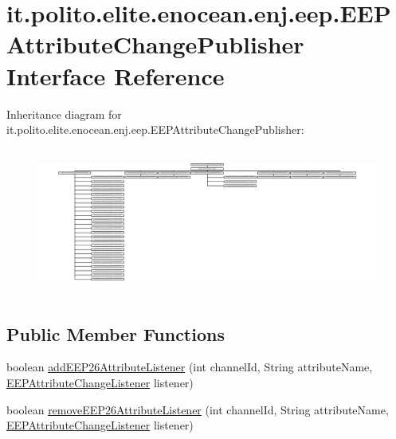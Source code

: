 \hypertarget{interfaceit_1_1polito_1_1elite_1_1enocean_1_1enj_1_1eep_1_1_e_e_p_attribute_change_publisher}{}\section{it.\+polito.\+elite.\+enocean.\+enj.\+eep.\+E\+E\+P\+Attribute\+Change\+Publisher Interface Reference}
\label{interfaceit_1_1polito_1_1elite_1_1enocean_1_1enj_1_1eep_1_1_e_e_p_attribute_change_publisher}
Inheritance diagram for it.\+polito.\+elite.\+enocean.\+enj.\+eep.\+E\+E\+P\+Attribute\+Change\+Publisher\+:\begin{figure}[H]
\begin{center}
\leavevmode
\includegraphics[height=4.866543cm]{interfaceit_1_1polito_1_1elite_1_1enocean_1_1enj_1_1eep_1_1_e_e_p_attribute_change_publisher}
\end{center}
\end{figure}
\subsection*{Public Member Functions}
\begin{DoxyCompactItemize}
\item 
boolean \hyperlink{interfaceit_1_1polito_1_1elite_1_1enocean_1_1enj_1_1eep_1_1_e_e_p_attribute_change_publisher_a31b54249f260223e3ac6a86b99da482c}{add\+E\+E\+P26\+Attribute\+Listener} (int channel\+Id, String attribute\+Name, \hyperlink{interfaceit_1_1polito_1_1elite_1_1enocean_1_1enj_1_1eep_1_1_e_e_p_attribute_change_listener}{E\+E\+P\+Attribute\+Change\+Listener} listener)
\item 
boolean \hyperlink{interfaceit_1_1polito_1_1elite_1_1enocean_1_1enj_1_1eep_1_1_e_e_p_attribute_change_publisher_a9c313dae8d996230bd8ddc6bcaa4c398}{remove\+E\+E\+P26\+Attribute\+Listener} (int channel\+Id, String attribute\+Name, \hyperlink{interfaceit_1_1polito_1_1elite_1_1enocean_1_1enj_1_1eep_1_1_e_e_p_attribute_change_listener}{E\+E\+P\+Attribute\+Change\+Listener} listener)
\end{DoxyCompactItemize}


